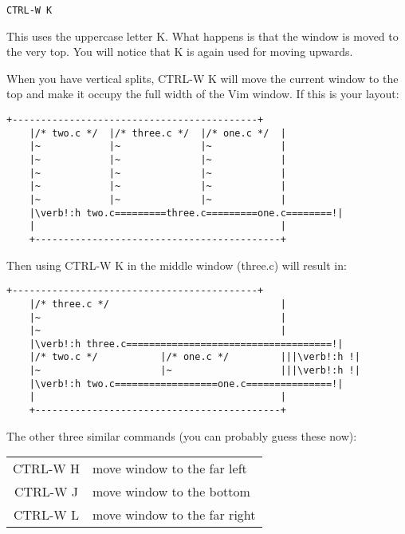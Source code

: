  \begin{Verbatim}[samepage=true]
 CTRL-W K
 \end{Verbatim}

This uses the uppercase letter K.
What happens is that the window is moved to the very top.
You will notice that K is again used for moving upwards.

When you have vertical splits, CTRL-W K will move the current window to the top and make it occupy the full width of the Vim window.
If this is your layout:

		\begin{Verbatim}[samepage=true]
    +-------------------------------------------+
    |/* two.c */  |/* three.c */  |/* one.c */  |
    |~            |~              |~            |
    |~            |~              |~            |
    |~            |~              |~            |
    |~            |~              |~            |
    |~            |~              |~            |
    |\verb!:h two.c=========three.c=========one.c========!|
    |                                           |
    +-------------------------------------------+
						\end{Verbatim}

Then using CTRL-W K in the middle window (three.c) will result in:

\begin{Verbatim}[samepage=true]
    +-------------------------------------------+
    |/* three.c */                              |
    |~                                          |
    |~                                          |
    |\verb!:h three.c====================================!|
    |/* two.c */           |/* one.c */         |||\verb!:h !|
    |~                     |~                   |||\verb!:h !|
    |\verb!:h two.c==================one.c===============!|
    |                                           |
    +-------------------------------------------+
\end{Verbatim}

The other three similar commands (you can probably guess these now):
\begin{center}
				\begin{longtable}{c l}
								CTRL-W H & move window to the far left \\
								CTRL-W J & move window to the bottom \\
								CTRL-W L & move window to the far right \\
				\end{longtable}
\end{center}
